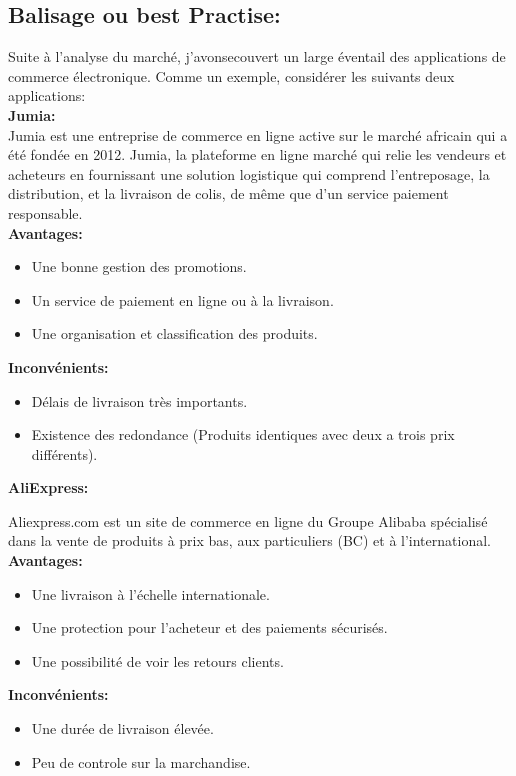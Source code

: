 \documentclass[a4paper]{report}
\begin{document}
\begin{doublespace}
\begin{doublespace}
        \subsection{Balisage ou best Practise:}
        Suite à l'analyse du marché, j'avonsecouvert un large éventail des applications de commerce électronique. Comme un exemple, considérer les suivants deux applications:\\
        \textbf{\large Jumia:}\\
        Jumia est une entreprise de commerce en ligne active sur le marché africain qui a été fondée en 2012. Jumia, la plateforme en ligne marché qui relie les vendeurs et acheteurs en fournissant une solution logistique qui comprend l'entreposage, la distribution, et la livraison de colis, de même que d'un  service paiement responsable.\\
        \textbf{Avantages:}
        \begin{itemize}
            \item Une bonne gestion des promotions.
            \item Un service de paiement en ligne ou à la livraison.
            \item Une organisation et classification des produits.
        \end{itemize}
        \textbf{Inconvénients:}
        \begin{itemize}
            \item Délais de livraison très importants.
            \item Existence des redondance (Produits identiques avec deux a trois prix différents).
        \end{itemize}
        \textbf{\large AliExpress:}\\
        \begin{doublespace}
            Aliexpress.com est un site de commerce en ligne du Groupe Alibaba spécialisé dans la vente
            de produits à prix bas, aux particuliers (BC) et à l’international.\\
            \textbf{Avantages:}
            \begin{itemize}
                \item Une livraison à l’échelle internationale.
                \item Une protection pour l’acheteur et des paiements sécurisés.
                \item Une possibilité de voir les retours clients.
            \end{itemize}
            \textbf{Inconvénients:}
            \begin{itemize}
                \item Une durée de livraison élevée.
                \item Peu de controle sur la marchandise.
            \end{itemize}
            \newpage

\end{doublespace}
\end{doublespace}
\end{doublespace}
\end{document}
